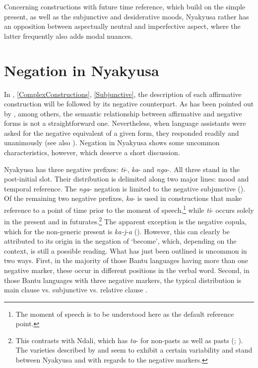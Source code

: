 Concerning constructions with future time reference, which build on the simple present, as well as the subjunctive and desiderative moods, Nyakyusa rather has an opposition between aspectually neutral and imperfective aspect, where the latter frequently also adds modal nuances.

\section{Negation in Nyakyusa}\label{Negations}
In , \ref{ComplexConstructions}, \ref{Subjunctive}, the description of each affirmative construction will be followed by its negative counterpart. As has been pointed out by \citet{ContiniMoravaE1989}, among others, the semantic relationship between affirmative and negative forms is not a straightforward one. Nevertheless, when language assistants were asked for the negative equivalent of a given form, they responded readily and unanimously (see also \citealt[196]{NurseD2008}). Negation in Nyakyusa shows some uncommon characteristics, however, which deserve a short discussion.

Nyakyusa has three negative prefixes: \textit{ti}-, \textit{ka}- and \textit{nga}-. All three stand in the  post-initial slot. Their distribution is delimited along two major lines: mood and temporal reference. The \textit{nga}- negation is limited to the negative subjunctive (). Of the remaining two negative prefixes, \textit{ka}- is used in constructions that make reference to a point of time prior to the moment of speech,\footnote{The moment of speech is to be understood here as the default reference point.} while \textit{ti}- occurs solely in the present and in futurates.\footnote{This contrasts with Ndali, which has \textit{ta}- for non-pasts as well as pasts (\citealt{BotneR2008}; \citealt{SwillaI1998}). The  varieties described by \citet{KishindoP1999} and \citet{LabroussiC1998} seem to exhibit a certain variability and stand between Nyakyusa and  with regards to the negative markers.} The apparent exception is the negative copula, which for the non-generic present is \textit{ka-j-a} (). However, this can clearly be attributed to its origin in the negation of \lq become', which, depending on the context, is still a possible reading. What has just been outlined is uncommon in two ways. First, in the majority of those Bantu languages having more than one negative marker, these occur in different positions in the verbal word. Second, in those Bantu languages with three negative markers, the typical distribution is main clause vs. subjunctive vs. relative clause \citep[184--191]{NurseD2008}.

